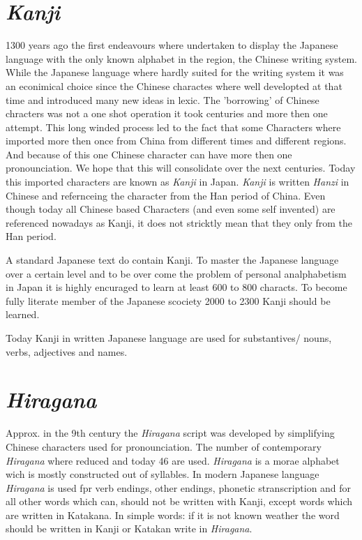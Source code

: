 \section*{\textit{Kanji}} 

1300 years ago the first endeavours where undertaken to display the Japanese
language with the only known alphabet in the region, the Chinese writing
system. While the Japanese language where hardly suited for the writing system
it was an  econimical choice since the Chinese charactes where well developted
at that time and introduced many new ideas in lexic. The 'borrowing' of Chinese
chracters was not a one shot operation it took centuries and more then one
attempt. This long winded process led to the fact that some Characters where
imported more then once from China from different times and different regions.
And because of this one Chinese character can have more then one
pronounciation. We hope that this will consolidate over the next centuries.
Today this imported characters are known as \textit{Kanji} in Japan.
\textit{Kanji} is written \textit{Hanzi} in Chinese and refernceing the
character from the Han period of China. Even though today all Chinese based
Characters (and even some self invented) are referenced nowadays as Kanji,
it does not stricktly mean that they only from the Han period.

A standard Japanese text do contain Kanji. To master the Japanese language
over a certain level and to be over come the problem of personal analphabetism
in Japan it is highly encuraged to learn at least 600 to 800 characts. To
 become fully literate member of the Japanese scociety 2000 to 2300 Kanji
 should be learned. 

Today  Kanji in written Japanese language are used for substantives/ nouns,
verbs, adjectives and names. 

\section*{\textit{Hiragana}}

Approx. in the 9th century the \textit{Hiragana} script was developed by
simplifying Chinese characters used for pronounciation. The number of
contemporary \textit{Hiragana} where reduced and today 46 are used.
\textit{Hiragana} is a morae alphabet wich is mostly constructed out of
syllables. In modern Japanese language \textit{Hiragana} is used fpr  verb
endings, other endings, phonetic stranscription and for all other words which
can, should not be written with Kanji, except words which are written in
Katakana. In simple words: if it is not known weather the word should be
written in Kanji or Katakan write in \textit{Hiragana}.


